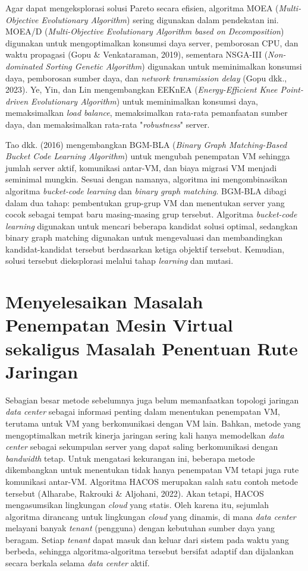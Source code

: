 Agar dapat mengeksplorasi solusi Pareto secara efisien, algoritma MOEA (\textit{Multi-Objective Evolutionary Algorithm}) sering digunakan dalam pendekatan ini. MOEA/D (\textit{Multi-Objective Evolutionary Algorithm based on Decomposition}) digunakan untuk mengoptimalkan konsumsi daya server, pemborosan CPU, dan waktu propagasi (Gopu & Venkataraman, 2019), sementara NSGA-III (\textit{Non-dominated Sorting Genetic Algorithm}) digunakan untuk meminimalkan konsumsi daya, pemborosan sumber daya, dan \textit{network transmission delay} (Gopu dkk., 2023). Ye, Yin, dan Lin mengembangkan EEKnEA (\textit{Energy-Efficient Knee Point-driven Evolutionary Algorithm}) untuk meminimalkan konsumsi daya, memaksimalkan \textit{load balance}, memaksimalkan rata-rata pemanfaatan sumber daya, dan memaksimalkan rata-rata "\textit{robustness}" server. 

Tao dkk. (2016) mengembangkan BGM-BLA (\textit{Binary Graph Matching-Based Bucket Code Learning Algorithm}) untuk mengubah penempatan VM sehingga jumlah server aktif, komunikasi antar-VM, dan biaya migrasi VM menjadi seminimal mungkin. Sesuai dengan namanya, algoritma ini mengombinasikan algoritma \textit{bucket-code learning} dan \textit{binary graph matching}. BGM-BLA dibagi dalam dua tahap: pembentukan grup-grup VM dan menentukan server yang cocok sebagai tempat baru masing-masing grup tersebut. Algoritma \textit{bucket-code learning} digunakan untuk mencari beberapa kandidat solusi optimal, sedangkan binary graph matching digunakan untuk mengevaluasi dan membandingkan kandidat-kandidat tersebut berdasarkan ketiga objektif tersebut. Kemudian, solusi tersebut dieksplorasi melalui tahap \textit{learning} dan mutasi.


\section{Menyelesaikan Masalah Penempatan Mesin Virtual sekaligus Masalah Penentuan Rute Jaringan}
Sebagian besar metode sebelumnya juga belum memanfaatkan topologi jaringan \textit{data center} sebagai informasi penting dalam menentukan penempatan VM, terutama untuk VM yang berkomunikasi dengan VM lain. Bahkan, metode yang mengoptimalkan metrik kinerja jaringan sering kali hanya memodelkan \textit{data center} sebagai sekumpulan server yang dapat saling berkomunikasi dengan \textit{bandwidth} tetap. Untuk mengatasi kekurangan ini, beberapa metode dikembangkan untuk menentukan tidak hanya penempatan VM tetapi juga rute komunikasi antar-VM. Algoritma HACOS merupakan salah satu contoh metode tersebut (Alharabe, Rakrouki & Aljohani, 2022). Akan tetapi, HACOS mengasumsikan lingkungan \textit{cloud} yang statis. Oleh karena itu, sejumlah algoritma dirancang untuk lingkungan \textit{cloud} yang dinamis, di mana \textit{data center} melayani banyak \textit{tenant} (pengguna) dengan kebutuhan sumber daya yang beragam. Setiap \textit{tenant} dapat masuk dan keluar dari sistem pada waktu yang berbeda, sehingga algoritma-algoritma tersebut bersifat adaptif dan dijalankan secara berkala selama \textit{data center} aktif.

